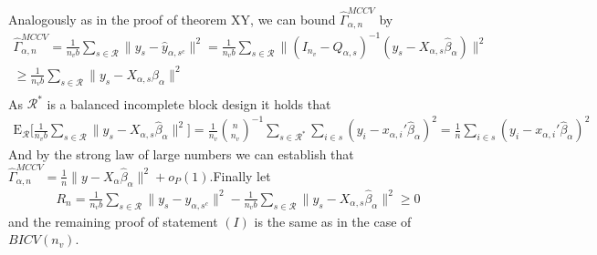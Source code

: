 \documentclass[Research_Module_ES.tex]{subfiles}
\begin{document}
Analogously as in the proof of theorem XY, we can bound $\hat{\Gamma}_{\alpha,n}^{MCCV}$ by
\begin{align*}
\hat{\Gamma}_{\alpha,n}^{MCCV}= \frac{1}{n_vb}\sum_{s\in \mathcal{R}}\lVert y_s-\hat{y}_{\alpha,s^c}\rVert^2
= \frac{1}{n_vb}\sum_{s\in \mathcal{R}}\lVert (I_{n_v}-Q_{\alpha,s})^{-1}(y_s-X_{\alpha,s}\hat{\beta}_\alpha)\rVert^2\\
\ge \frac{1}{n_vb}\sum_{s\in \mathcal{R}}\lVert y_s-X_{\alpha,s}\hat{\beta}_\alpha\rVert^2\\
\end{align*}
As $\mathcal{R}^\ast$ is a balanced incomplete block design it holds that
\begin{align*}
\mathrm{E}_\mathcal{R} \biggl[\frac{1}{n_vb}\sum_{s\in \mathcal{R}}\lVert y_s-X_{\alpha,s}\hat{\beta}_\alpha\rVert^2 \biggr] 
= \frac{1}{n_v}\binom{n}{n_v}^{-1}\sum_{s\in \mathcal{R}^\ast}\sum_{i\in s}(y_i-x_{\alpha,i}'\hat{\beta}_\alpha)^2
= \frac{1}{n}\sum_{i\in s}(y_i-x_{\alpha,i}'\hat{\beta}_\alpha)^2
\end{align*}
And by the strong law of large numbers 
we can establish that $\hat{\Gamma}_{\alpha,n}^{MCCV} = \frac{1}{n}\lVert y-X_{\alpha}\hat{\beta}_\alpha\rVert^2 + o_P(1)$.Finally let
\begin{align*}
R_n= \frac{1}{n_vb}\sum_{s\in \mathcal{R}}\lVert y_s-\hat{y}_{\alpha,s^c}\rVert^2- \frac{1}{n_vb}\sum_{s\in \mathcal{R}}\lVert y_s-X_{\alpha,s}\hat{\beta}_\alpha\rVert^2 \ge 0
\end{align*} 
and the remaining proof of statement $(I)$ is the same as in the case of $BICV(n_v)$.
\end{document}
